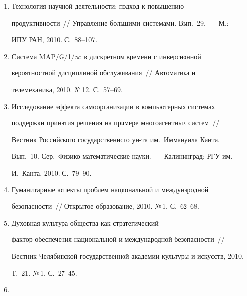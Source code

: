 \begin{enumerate}[1.]
Информация как универсальная неоднородность~/\!\!/ Информационные 


технологии, 2010. №\,4. С.~66--74.


\item {}


Технология научной деятельности: подход к повышению 


продуктивности~/\!\!/ Управление большими сис\-темами. Вып.~29.~--- М.: 


ИПУ РАН, 2010. С.~88--107.


\item {}


Система MAP/G/1/$\infty$ в дискретном времени с инверсионной 


вероятностной дисциплиной обслуживания~/\!\!/  Автоматика и 


телемеханика, 2010. №\,12. С.~57--69.


\item {}


Исследование эффекта самоорганизации в компьютерных сис\-темах 


поддержки принятия решения на примере многоагентных сис\-тем~/\!\!/  


Вестник Российского государственного ун-та им.\ Иммануила Канта. 


Вып.~10. Сер.\ Физико-математические науки.~--- Калининград: РГУ им.\ 


И.~Канта, 2010. С.~79--90.





\item {}


Гуманитарные аспекты проблем национальной и международной 


безопасности~/\!\!/  Открытое образование, 2010. №\,1. С.~62--68.


\item {} Духовная культура общества как стратегический 


фактор обеспечения национальной и международной безопасности~/\!\!/  


Вестник Челябинской государственной академии культуры и искусств, 2010. 


Т.~21. №\,1. С.~27--45.


\item {}



\end{enumerate}

